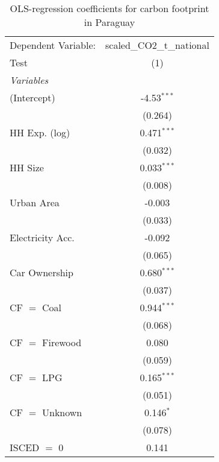 
\begin{table}[htbp!]
   \centering
   \small
   \begin{adjustbox}{width = 1\textwidth, max height = 0.95\textheight, center}
      \begin{threeparttable}[b]
         \caption{\label{tab:OLS_2_PRY} OLS-regression coefficients for carbon footprint in Paraguay}
         \begin{tabular}{lc}
            \tabularnewline \midrule \midrule
            Dependent Variable: & scaled\_CO2\_t\_national\\     
            Test                & (1)\\  
            \midrule
            \emph{Variables}\\
            (Intercept)         & -4.53$^{***}$\\   
                                & (0.264)\\   
            HH Exp. (log)       & 0.471$^{***}$\\   
                                & (0.032)\\   
            HH Size             & 0.033$^{***}$\\   
                                & (0.008)\\   
            Urban Area          & -0.003\\   
                                & (0.033)\\   
            Electricity Acc.    & -0.092\\   
                                & (0.065)\\   
            Car Ownership       & 0.680$^{***}$\\   
                                & (0.037)\\   
            CF $=$ Coal         & 0.944$^{***}$\\   
                                & (0.068)\\   
            CF $=$ Firewood     & 0.080\\   
                                & (0.059)\\   
            CF $=$ LPG          & 0.165$^{***}$\\   
                                & (0.051)\\   
            CF $=$ Unknown      & 0.146$^{*}$\\   
                                & (0.078)\\   
            ISCED $=$ 0         & 0.141\\   

\end{tabular}
\end{threeparttable}
\end{adjustbox}
\end{table}
